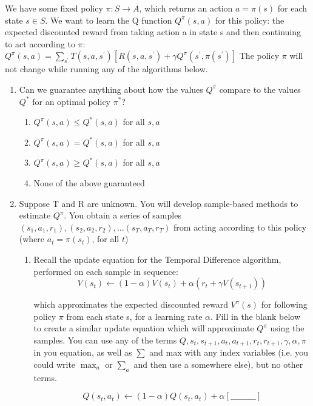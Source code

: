\documentclass[11pt, answers]{exam}
\begin{document}
We have some fixed policy $\pi: S \rightarrow A$, which returns an action $a=\pi(s)$ for each state $s \in S$. We want to learn the Q function $Q^{\pi}(s, a)$ for this policy: the expected discounted reward from taking action a in state s and then
continuing to act according to $\pi$:$Q^{\pi}(s, a)=\sum_{s^{\prime}} T\left(s, a, s^{\prime}\right)\left[R\left(s, a, s^{\prime}\right)+\gamma Q^{\pi}\left(s^{\prime}, \pi\left(s^{\prime}\right)\right]\right.$ The policy $\pi$ will not change
while running any of the algorithms below.
\begin{enumerate}
\item Can we guarantee anything about how the values $Q^{\pi}$ compare to the values $Q^{*}$ for an optimal policy $\pi^{*}$?
\begin{enumerate}
\item $Q^{\pi}(s, a) \leq Q^{*}(s, a)$ for all $s,a$
\item $Q^{\pi}(s, a) = Q^{*}(s, a)$ for all $s,a$
\item $Q^{\pi}(s, a) \geq Q^{*}(s, a)$ for all $s,a$
\item None of the above guaranteed
\end{enumerate}

\item Suppose T and R are unknown. You will develop sample-based methods to estimate $Q^{\pi}$. You obtain a series of samples $\left(s_{1}, a_{1}, r_{1}\right),\left(s_{2}, a_{2}, r_{2}\right), \ldots\left(s_{T}, a_{T}, r_{T}\right)$ from acting according to this policy (where $a_t = \pi(s_t)$, for all $t$)
\begin{enumerate}
\item Recall the update equation for the Temporal Difference algorithm, performed on each sample in sequence:
$$V\left(s_{t}\right) \leftarrow(1-\alpha) V\left(s_{t}\right)+\alpha\left(r_{t}+\gamma V\left(s_{t+1}\right)\right)$$

which approximates the expected discounted reward $V^{\pi}(s)$ for following policy $\pi$ from each state s, for a learning rate $\alpha$.
Fill in the blank below to create a similar update equation which will approximate $Q^{\pi}$  using the samples.
You can use any of the terms $Q, s_{t}, s_{t+1}, a_{t}, a_{t+1}, r_{t}, r_{t+1}, \gamma, \alpha, \pi$ in you equation, as well as $\sum$ and max
with any index variables (i.e. you could write $\max _{a}$ or $\sum_{a}$ and then use a somewhere else), but no other terms.

$$Q\left(s_{t}, a_{t}\right) \leftarrow(1-\alpha) Q\left(s_{t}, a_{t}\right)+\alpha[\_\_\_\_\_\_\_\_\_]$$


\end{enumerate}
\end{enumerate}
\end{document}
